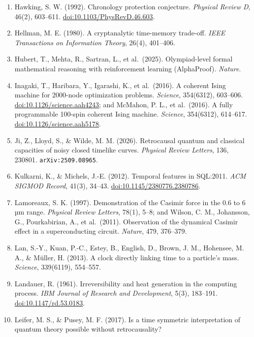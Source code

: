 \documentclass[10pt,letterpaper]{article}
\begin{document}
\begin{enumerate}
\item
  Hawking, S. W. (1992). Chronology protection conjecture.
  \emph{Physical Review D}, 46(2), 603--611.
  \href{https://doi.org/10.1103/PhysRevD.46.603}{doi:10.1103/PhysRevD.46.603}.
\item
  Hellman, M. E. (1980). A cryptanalytic time-memory trade-off.
  \emph{IEEE Transactions on Information Theory}, 26(4), 401--406.
\item
  Hubert, T., Mehta, R., Sartran, L., et al.~(2025). Olympiad-level
  formal mathematical reasoning with reinforcement learning
  (AlphaProof). \emph{Nature}.
\item
  Inagaki, T., Haribara, Y., Igarashi, K., et al.~(2016). A coherent
  Ising machine for 2000-node optimization problems. \emph{Science},
  354(6312), 603--606.
  \href{https://doi.org/10.1126/science.aah4243}{doi:10.1126/science.aah4243};
  and McMahon, P. L., et al.~(2016). A fully programmable 100-spin
  coherent Ising machine. \emph{Science}, 354(6312), 614--617.
  \href{https://doi.org/10.1126/science.aah5178}{doi:10.1126/science.aah5178}.
\item
  Ji, Z., Lloyd, S., \& Wilde, M. M. (2026). Retrocausal quantum and
  classical capacities of noisy closed timelike curves. \emph{Physical
  Review Letters}, 136, 230801. \texttt{arXiv:2509.\allowbreak{}08965}.
\item
  Kulkarni, K., \& Michels, J.-E. (2012). Temporal features in SQL:2011.
  \emph{ACM SIGMOD Record}, 41(3), 34--43.
  \href{https://doi.org/10.1145/2380776.2380786}{doi:10.1145/2380776.2380786}.
\item
  Lamoreaux, S. K. (1997). Demonstration of the Casimir force in the 0.6
  to 6 µm range. \emph{Physical Review Letters}, 78(1), 5--8; and
  Wilson, C. M., Johansson, G., Pourkabirian, A., et al.~(2011).
  Observation of the dynamical Casimir effect in a superconducting
  circuit. \emph{Nature}, 479, 376--379.
\item
  Lan, S.-Y., Kuan, P.-C., Estey, B., English, D., Brown, J. M.,
  Hohensee, M. A., \& Müller, H. (2013). A clock directly linking time
  to a particle's mass. \emph{Science}, 339(6119), 554--557.
\item
  Landauer, R. (1961). Irreversibility and heat generation in the
  computing process. \emph{IBM Journal of Research and Development},
  5(3), 183--191.
  \href{https://doi.org/10.1147/rd.53.0183}{doi:10.1147/rd.53.0183}.
\item
  Leifer, M. S., \& Pusey, M. F. (2017). Is a time symmetric
  interpretation of quantum theory possible without retrocausality?

\end{enumerate}
\end{document}
